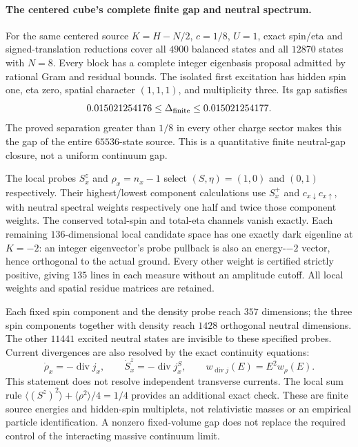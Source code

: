 \paragraph{The centered cube's complete finite gap and neutral spectrum.}
For the same centered source $K=H-N/2$, $c=1/8$, $U=1$, exact
spin/eta and signed-translation reductions cover all $4900$ balanced
states and all $12870$ states with $N=8$.  Every block has a complete
integer eigenbasis proposal admitted by rational Gram and residual
bounds.  The isolated first excitation has hidden spin one, eta zero,
spatial character $(1,1,1)$, and multiplicity three.  Its gap satisfies
\[
  0.015021254176\leq\Delta_{\rm finite}\leq0.015021254177.
\]
The proved separation greater than $1/8$ in every other charge sector
makes this the gap of the entire $65536$-state source.  This is a
quantitative finite neutral-gap closure, not a uniform continuum gap.

The local probes $S^z_x$ and $\rho_x=n_x-1$ select $(S,\eta)=(1,0)$
and $(0,1)$ respectively.  Their highest/lowest component calculations
use $S^+_x$ and $c_{x\downarrow}c_{x\uparrow}$, with neutral spectral
weights respectively one half and twice those component weights.
The conserved total-spin and total-eta channels vanish exactly.
Each remaining $136$-dimensional local candidate space has one exactly
dark eigenline at $K=-2$: an integer eigenvector's probe pullback is
also an energy-$-2$ vector, hence orthogonal to the actual ground.
Every other weight is certified strictly positive, giving $135$ lines
in each measure without an amplitude cutoff.  All local weights and
spatial residue matrices are retained.

Each fixed spin component and the density probe reach $357$ dimensions;
the three spin components together with density reach $1428$
orthogonal neutral dimensions.  The other $11441$ excited neutral
states are invisible to these specified probes.  Current divergences
are also resolved by the exact continuity equations:
\[
 \dot\rho_x=-\operatorname{div}j_x,\qquad
 \dot S^z_x=-\operatorname{div}j^S_x,\qquad
 w_{\operatorname{div}j}(E)=E^2w_\rho(E).
\]
This statement does not resolve independent transverse currents.
The local sum rule $\langle(S^z)^2\rangle+\langle\rho^2\rangle/4=1/4$
provides an additional exact check.  These are finite source energies
and hidden-spin multiplets, not relativistic masses or an empirical
particle identification.  A nonzero fixed-volume gap does not replace
the required control of the interacting massive continuum limit.
